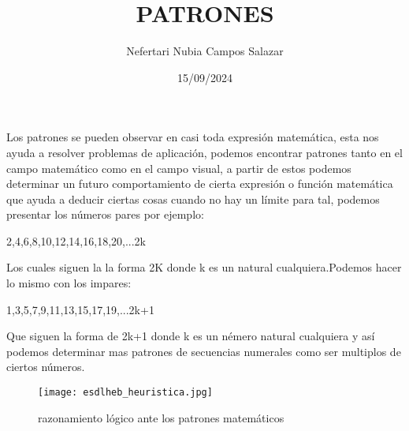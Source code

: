 \documentclass[12pt, letter paper]{article}
\title{PATRONES}
\date{15/09/2024}
\author{Nefertari Nubia Campos Salazar}
\begin{document}
\maketitle
Los patrones se pueden observar en casi toda expresión matemática, esta nos ayuda  a resolver problemas de aplicación, podemos encontrar patrones tanto en el campo matemático como en el campo visual, a partir de estos podemos determinar un futuro comportamiento de cierta expresión o función matemática que ayuda a deducir ciertas cosas cuando no hay un límite para tal, podemos presentar los números pares por ejemplo:
\begin{center}
2,4,6,8,10,12,14,16,18,20,...2k
\end{center}
Los cuales siguen la la forma 2K donde k es un natural cualquiera.Podemos hacer lo mismo con los impares:
\begin{center}
1,3,5,7,9,11,13,15,17,19,...2k+1
\end{center}
Que siguen la forma de 2k+1 donde k es un némero natural cualquiera y así podemos determinar mas patrones de secuencias numerales como ser multiplos de ciertos números.
\begin{figure}[ht]
    \centering
    \texttt{[image: esdlheb\_heuristica.jpg]}
    \caption{razonamiento lógico ante los patrones matemáticos}
    \label{fig:enter-label}
\end{figure}
\end{document}

